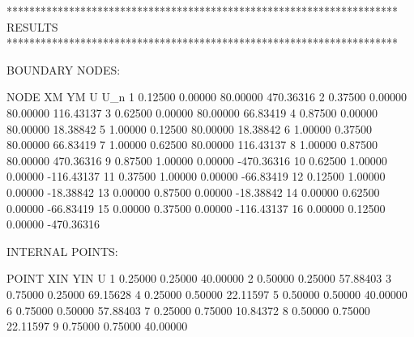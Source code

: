 \begin{matlaboutput}
*********************************************************************
RESULTS
*********************************************************************

BOUNDARY NODES:

NODE        XM            YM            U             U_n
 1        0.12500       0.00000      80.00000     470.36316
 2        0.37500       0.00000      80.00000     116.43137
 3        0.62500       0.00000      80.00000      66.83419
 4        0.87500       0.00000      80.00000      18.38842
 5        1.00000       0.12500      80.00000      18.38842
 6        1.00000       0.37500      80.00000      66.83419
 7        1.00000       0.62500      80.00000     116.43137
 8        1.00000       0.87500      80.00000     470.36316
 9        0.87500       1.00000       0.00000    -470.36316
 10       0.62500       1.00000       0.00000    -116.43137
 11       0.37500       1.00000       0.00000     -66.83419
 12       0.12500       1.00000       0.00000     -18.38842
 13       0.00000       0.87500       0.00000     -18.38842
 14       0.00000       0.62500       0.00000     -66.83419
 15       0.00000       0.37500       0.00000    -116.43137
 16       0.00000       0.12500       0.00000    -470.36316

INTERNAL POINTS:

POINT        XIN           YIN           U
  1        0.25000       0.25000      40.00000
  2        0.50000       0.25000      57.88403
  3        0.75000       0.25000      69.15628
  4        0.25000       0.50000      22.11597
  5        0.50000       0.50000      40.00000
  6        0.75000       0.50000      57.88403
  7        0.25000       0.75000      10.84372
  8        0.50000       0.75000      22.11597
  9        0.75000       0.75000      40.00000
\end{matlaboutput}